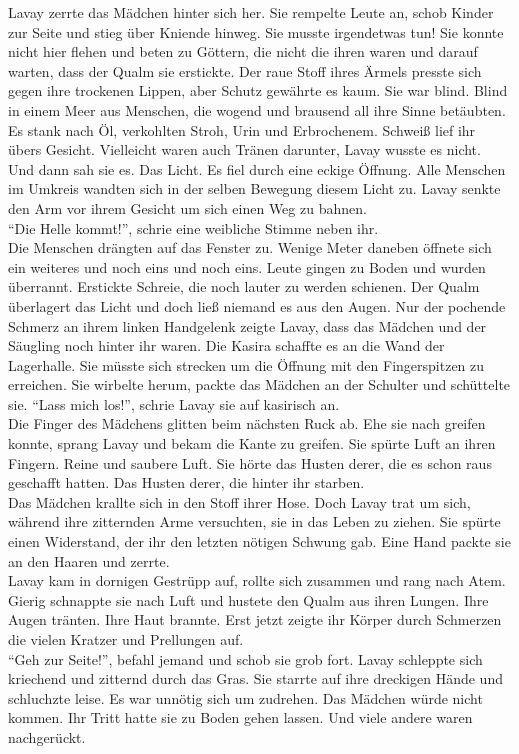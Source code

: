 Lavay zerrte das Mädchen hinter sich her. Sie rempelte Leute an, schob Kinder zur Seite und stieg 
über Kniende hinweg. Sie musste irgendetwas tun! Sie konnte nicht hier flehen und beten zu Göttern, 
die nicht die ihren waren und darauf warten, dass der Qualm sie erstickte. Der raue Stoff ihres 
Ärmels presste sich gegen ihre trockenen Lippen, aber Schutz gewährte es kaum. Sie war blind. Blind 
in einem Meer aus Menschen, die wogend und brausend all ihre Sinne betäubten. Es stank nach Öl, 
verkohlten Stroh, Urin und Erbrochenem. Schweiß lief ihr übers Gesicht. Vielleicht waren auch 
Tränen darunter, Lavay wusste es nicht.\\
Und dann sah sie es. Das Licht. Es fiel durch eine eckige Öffnung. Alle Menschen im Umkreis wandten 
sich in der selben Bewegung diesem Licht zu. Lavay senkte den Arm vor ihrem Gesicht um sich einen 
Weg zu bahnen.\\
``Die Helle kommt!'', schrie eine weibliche Stimme neben ihr.\\
Die Menschen drängten auf das Fenster zu. Wenige Meter daneben öffnete sich ein weiteres und noch 
eins und noch eins. Leute gingen zu Boden und wurden überrannt. Erstickte Schreie, die noch lauter 
zu werden schienen. Der Qualm überlagert das Licht und doch ließ niemand es aus den Augen. Nur der 
pochende Schmerz an ihrem linken Handgelenk zeigte Lavay, dass das Mädchen und der Säugling noch 
hinter ihr waren. Die Kasira schaffte es an die Wand der Lagerhalle. Sie müsste sich strecken um 
die Öffnung mit den Fingerspitzen zu erreichen. Sie wirbelte herum, packte das Mädchen an der Schulter und schüttelte 
sie. ``Lass mich los!'', schrie Lavay sie auf kasirisch an.\\
Die Finger des Mädchens glitten beim nächsten Ruck ab. Ehe sie nach greifen konnte, sprang Lavay 
und bekam die Kante zu greifen. Sie spürte Luft an ihren Fingern. Reine und saubere Luft. Sie hörte das Husten
derer, die es schon raus geschafft hatten. Das Husten derer, die hinter ihr starben.\\
Das Mädchen krallte sich in den Stoff ihrer Hose. Doch Lavay trat um sich, während ihre zitternden 
Arme versuchten, sie in das Leben zu ziehen. Sie spürte einen Widerstand, der ihr den letzten 
nötigen Schwung gab. Eine Hand packte sie an den Haaren und zerrte.\\
Lavay kam in dornigen Gestrüpp auf, rollte sich zusammen und rang nach Atem. Gierig schnappte sie nach 
Luft und hustete den Qualm aus ihren Lungen. Ihre Augen tränten. Ihre Haut brannte. Erst jetzt 
zeigte ihr Körper durch Schmerzen die vielen Kratzer und Prellungen auf.\\
``Geh zur Seite!'', befahl jemand und schob sie grob fort. Lavay schleppte sich 
kriechend und zitternd durch das Gras. Sie starrte auf ihre dreckigen Hände und schluchzte leise. 
Es war unnötig sich um zudrehen. Das Mädchen würde nicht kommen. Ihr Tritt hatte sie zu Boden gehen 
lassen. Und viele andere waren nachgerückt.\\

